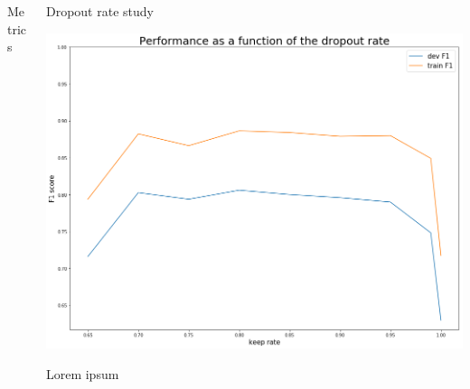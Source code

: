 \documentclass[final]{beamer}
\newlength{\onecolwid}
\newlength{\twocolwid}
\begin{document}
\begin{frame}[t]
\begin{columns}[t]
\begin{column}{\twocolwid}
\begin{columns}[t,totalwidth=\twocolwid]
\begin{column}{\onecolwid}
\begin{block}{Metrics}
\end{block}


\end{column} %

\begin{column}{\onecolwid}\vspace{-.6in} %


\begin{block}{Dropout rate study}
\begin{center}
  \includegraphics[scale=0.5]{figs/dr_graph.png}
\end{center}

Lorem ipsum


\end{block}


\end{column} %

\end{columns} %



\end{column}
\end{columns}
\end{frame}
\end{document}
